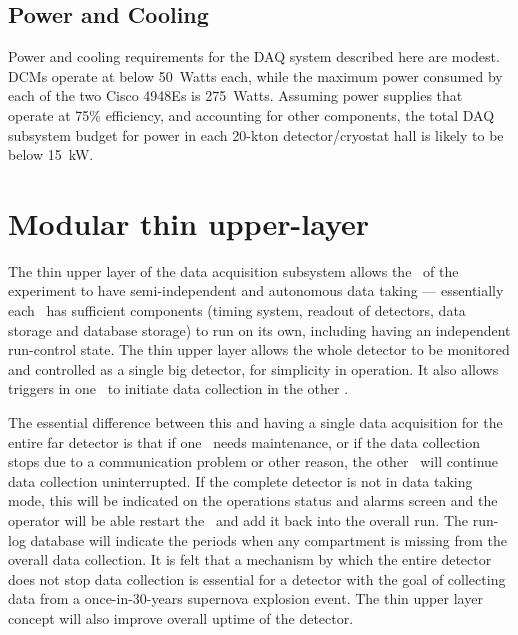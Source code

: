 \subsection{Power and Cooling}

Power and cooling requirements for the DAQ system described here are 
modest.  DCMs operate at below 50~Watts each, while the maximum power 
consumed by each of the two Cisco 4948Es is 275~Watts.  Assuming 
power supplies that operate at 75\% efficiency, and accounting for 
other components, the total DAQ subsystem budget for power 
in each 20-kton detector/cryostat hall is likely to be below 15~kW.

\section{Modular thin upper-layer}
\label{sec:daq_upper}

The thin upper layer of the data acquisition subsystem allows the
\COMPARTMENTS\ of the experiment to have semi-independent and
autonomous data taking --- essentially each \COMPARTMENT\ has sufficient
components (timing system, readout of detectors, data storage and
database storage) to run on its own, including having an independent
run-control state.  The thin upper layer allows the whole detector to
be monitored and controlled as a single big detector, for simplicity
in operation.  It also allows triggers in one \COMPARTMENT\ to initiate
data collection in the other \COMPARTMENTS.

The essential difference between this and having a single data
acquisition for the entire far detector is that if one \COMPARTMENT\
needs maintenance, or if the data collection stops due to a
communication problem or other reason, the other \COMPARTMENTS\ will
continue data collection uninterrupted.  If the complete detector is
not in data taking mode, this will be indicated on the operations
status and alarms screen and the operator will be able restart the
\COMPARTMENT\ and add it back into the overall run.  The run-log
database will indicate the periods when any compartment is missing
from the overall data collection.  It is felt that a mechanism by
which the entire detector does not stop data collection is essential
for a detector with the goal of collecting data from a
once-in-30-years supernova explosion event.  The thin upper layer
concept will also improve overall uptime of the detector.

